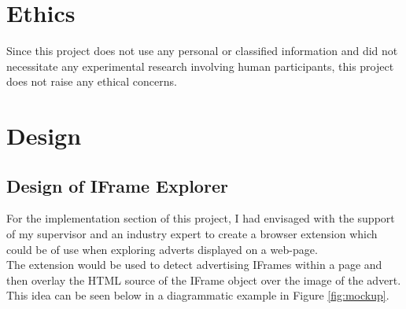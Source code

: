 \documentclass[12pt]{article}
\begin{document}
\section{Ethics}
Since this project does not use any personal or classified information and did not necessitate any experimental research involving human participants, this project does not raise any ethical concerns. 

\pagebreak

\section{Design}

\subsection{Design of IFrame Explorer}
For the implementation section of this project, I had envisaged with the support of my supervisor and an industry expert to create a browser extension which could be of use when exploring adverts displayed on a web-page.  \\

The extension would be used to detect advertising IFrames within a page and then overlay the HTML source of the IFrame object over the image of the advert. This idea can be seen below in a diagrammatic example in Figure \ref{fig:mockup}. 
\end{document}
